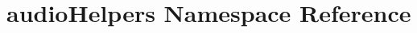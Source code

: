 \hypertarget{namespaceaudio_helpers}{
\section{audioHelpers Namespace Reference}
\label{namespaceaudio_helpers}
}
